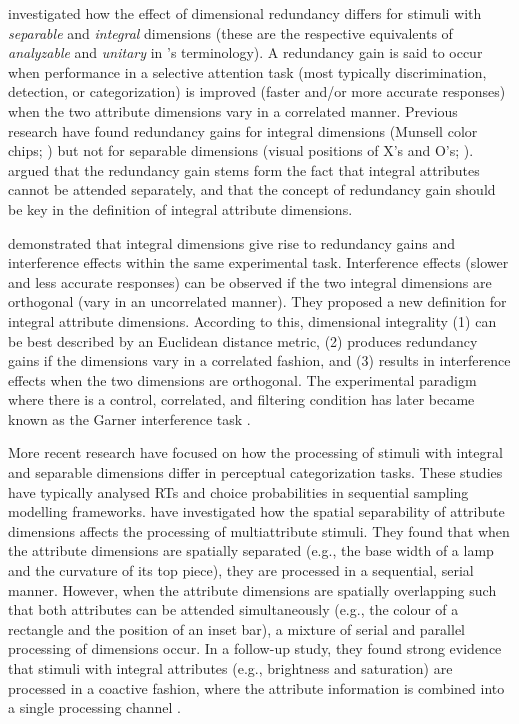 \documentclass[11pt,a4paper]{article}
\begin{document}
 investigated how the effect of dimensional redundancy differs for stimuli with \textit{separable} and \textit{integral} dimensions (these are the respective equivalents of \textit{analyzable} and \textit{unitary} in \citeauthor{Shepard1964}'s terminology). A redundancy gain is said to occur when performance in a selective attention task (most typically discrimination, detection, or categorization) is improved (faster and/or more accurate responses) when the two attribute dimensions vary in a correlated manner. Previous research have found redundancy gains for integral dimensions (Munsell color chips; ) but not for separable dimensions (visual positions of X's and O's; ). \citeauthor{Lockhead1966} argued that the redundancy gain stems form the fact that integral attributes cannot be attended separately, and that the concept of redundancy gain should be key in the definition of integral attribute dimensions. 

 demonstrated that integral dimensions give rise to redundancy gains and interference effects within the same experimental task. Interference effects  (slower and less accurate responses) can be observed if the two integral dimensions are orthogonal (vary in an uncorrelated manner). They proposed a new definition for integral attribute dimensions. According to this, dimensional integrality (1) can be best described by an Euclidean distance metric, (2) produces redundancy gains if the dimensions vary in a correlated fashion, and (3) results in interference effects when the two dimensions are orthogonal. The experimental paradigm where there is a control, correlated, and filtering condition has later became known as the Garner interference task \cite{Burns2014}.

More recent research have focused on how the processing of stimuli with integral and separable dimensions differ in perceptual categorization tasks. These studies have typically analysed RTs and choice probabilities in sequential sampling modelling frameworks.  have investigated how the spatial separability of attribute dimensions affects the processing of multiattribute stimuli. They found that when the attribute dimensions are spatially separated (e.g., the base width of a lamp and the curvature of its top piece), they are processed in a sequential, serial manner. However, when the attribute dimensions are spatially overlapping such that both attributes can be attended simultaneously (e.g., the colour of a rectangle and the position of an inset bar), a mixture of serial and parallel processing of dimensions occur. In a follow-up study, they found strong evidence that stimuli with integral attributes (e.g., brightness and saturation) are processed in a coactive fashion, where the attribute information is combined into a single processing channel \cite{Littleetal2013}.
\end{document}
